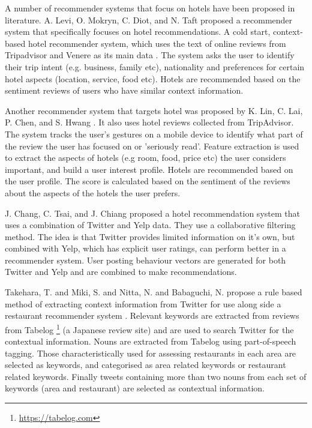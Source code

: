 A number of recommender systems that focus on hotels have been proposed in literature. A. Levi, O. Mokryn, C. Diot, and N. Taft proposed a recommender system that specifically focuses on hotel recommendations. A cold start, context-based hotel recommender system, which uses the text of online reviews from Tripadvisor and Venere as its main data \cite{levi2012}. The system asks the user to identify their trip intent (e.g. business, family etc), nationality and preferences for certain hotel aspects (location, service, food etc). Hotels are recommended based on the sentiment reviews of users who have similar context information.

Another recommender system that targets hotel was proposed by K. Lin, C. Lai, P. Chen, and S. Hwang \cite{lin2015}. It also uses hotel reviews collected from TripAdvisor. The system tracks the user's gestures on a mobile device to identify what part of the review the user has focused on or 'seriously read'. Feature extraction is used to extract the aspects of hotels (e.g room, food, price etc) the user considers important, and build a user interest profile. Hotels are recommended based on the user profile. The score is calculated based on the sentiment of the reviews about the aspects of the hotels the user prefers.

J. Chang, C. Tsai, and J. Chiang \cite{chang2018} proposed a hotel recommendation system that uses a combination of Twitter and Yelp data. They use a collaborative filtering method. The idea is that Twitter provides limited information on it's own, but combined with Yelp, which has explicit user ratings, can perform better in a recommender system. User posting behaviour vectors are generated for both Twitter and Yelp and are combined to make recommendations.

Takehara, T. and Miki, S. and Nitta, N. and Babaguchi, N. propose a rule based method of extracting context information from Twitter for use along side a restaurant recommender system \cite{takeharaContext2012}. Relevant keywords are extracted from reviews from Tabelog \footnote{\url{https://tabelog.com}} (a Japanese review site) and are used to search Twitter for the contextual information. Nouns are extracted from Tabelog using part-of-speech tagging. Those characteristically used for assessing restaurants in each area are selected as keywords, and categorised as area related keywords or restaurant related keywords. Finally tweets containing more than two nouns from each set of keywords (area and restaurant) are selected as contextual information.

